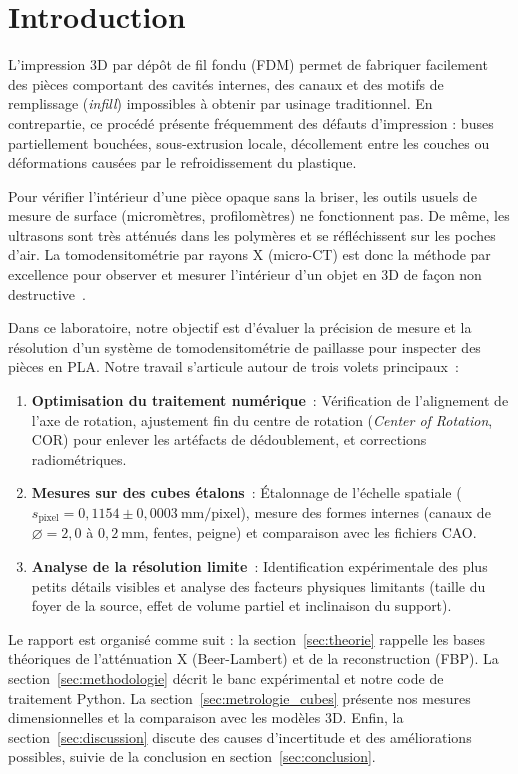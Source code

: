 \section{Introduction}
\label{sec:introduction}

L'impression 3D par dépôt de fil fondu (FDM) permet de fabriquer facilement des pièces comportant des cavités internes, des canaux et des motifs de remplissage (\emph{infill}) impossibles à obtenir par usinage traditionnel. En contrepartie, ce procédé présente fréquemment des défauts d'impression : buses partiellement bouchées, sous-extrusion locale, décollement entre les couches ou déformations causées par le refroidissement du plastique.

Pour vérifier l'intérieur d'une pièce opaque sans la briser, les outils usuels de mesure de surface (micromètres, profilomètres) ne fonctionnent pas. De même, les ultrasons sont très atténués dans les polymères et se réfléchissent sur les poches d'air. La tomodensitométrie par rayons X (micro-CT) est donc la méthode par excellence pour observer et mesurer l'intérieur d'un objet en 3D de façon non destructive~\cite{kruth2011computed, carmignato2014industrial}.

Dans ce laboratoire, notre objectif est d'évaluer la précision de mesure et la résolution d'un système de tomodensitométrie de paillasse pour inspecter des pièces en PLA. Notre travail s'articule autour de trois volets principaux~:
\begin{enumerate}
    \item \textbf{Optimisation du traitement numérique}~: Vérification de l'alignement de l'axe de rotation, ajustement fin du centre de rotation (\emph{Center of Rotation}, COR) pour enlever les artéfacts de dédoublement, et corrections radiométriques.
    \item \textbf{Mesures sur des cubes étalons}~: Étalonnage de l'échelle spatiale ($s_{\text{pixel}} = 0{,}1154 \pm 0{,}0003~\text{mm/pixel}$), mesure des formes internes (canaux de $\varnothing = 2{,}0$ à $0{,}2~\text{mm}$, fentes, peigne) et comparaison avec les fichiers CAO.
    \item \textbf{Analyse de la résolution limite}~: Identification expérimentale des plus petits détails visibles et analyse des facteurs physiques limitants (taille du foyer de la source, effet de volume partiel et inclinaison du support).
\end{enumerate}

Le rapport est organisé comme suit : la section~\ref{sec:theorie} rappelle les bases théoriques de l'atténuation X (Beer-Lambert) et de la reconstruction (FBP). La section~\ref{sec:methodologie} décrit le banc expérimental et notre code de traitement Python. La section~\ref{sec:metrologie_cubes} présente nos mesures dimensionnelles et la comparaison avec les modèles 3D. Enfin, la section~\ref{sec:discussion} discute des causes d'incertitude et des améliorations possibles, suivie de la conclusion en section~\ref{sec:conclusion}.
